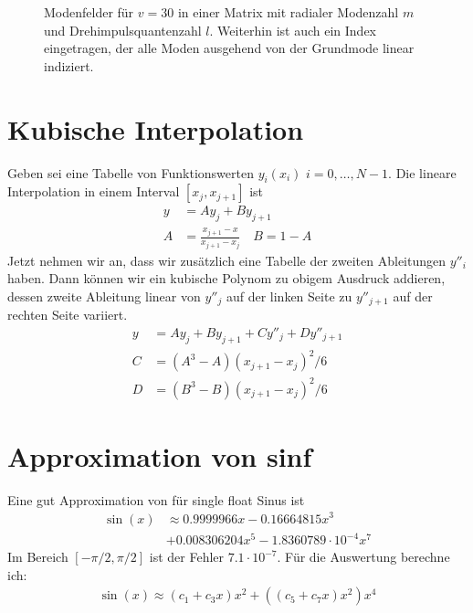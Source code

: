 \documentclass[DIV19,twocolumn]{scrartcl}
\def\svgending{\ifx\pdfoutput\undefined%
  .eps_tex%
  \else%
  .pdf_tex%
  \fi}
\newcommand{\svginput}[2]{{\def\svgscale{#1}}}
\begin{document}
\begin{figure}[hbtp]
  \centering
  \svginput{1}{modes}
  \caption{Modenfelder f\"ur $v=30$ in einer Matrix mit radialer
    Modenzahl $m$ und Drehimpulsquantenzahl $l$. Weiterhin ist auch
    ein Index eingetragen, der alle Moden ausgehend von der Grundmode
    linear indiziert.}
  \label{fig:fields}
\end{figure}
\section{Kubische Interpolation}
Geben sei eine Tabelle von Funktionswerten $y_i(x_i)$
$i=0,\ldots,N-1$. Die lineare Interpolation in einem Interval
$[x_j,x_{j+1}]$ ist
\begin{align}
  y &= Ay_j + By_{j+1} \\
  A &= \frac{x_{j+1}-x}{x_{j+1}-x_j}\quad B=1-A
\end{align}
Jetzt nehmen wir an, dass wir zus\"atzlich eine Tabelle der zweiten
Ableitungen $y''_i$ haben. Dann k\"onnen wir ein kubische Polynom zu
obigem Ausdruck addieren, dessen zweite Ableitung linear von $y''_j$
auf der linken Seite zu $y''_{j+1}$ auf der rechten Seite variiert.
\begin{align}
  y &= Ay_j + By_{j+1} + Cy''_j + Dy''_{j+1} \\
  C &= (A^3-A)(x_{j+1}-x_j)^2/6 \\
  D &= (B^3-B)(x_{j+1}-x_j)^2/6 
\end{align}
\section{Approximation von sinf}
Eine gut Approximation von f\"ur single float Sinus ist
\begin{align}
  \sin(x)&\approx 0.9999966 x -0.16664815 x^3 \nonumber\\
  &+0.008306204 x^5 -1.8360789\cdot 10^{-4} x^7 
\end{align}
Im Bereich $[-\pi/2,\pi/2]$ ist der Fehler $7.1\cdot 10^{-7}$.
F\"ur die Auswertung berechne ich:
\begin{align}
  \sin(x) \approx (c_1 + c_3 x) x^2 + ( (c_5 +c_7 x)x^2) x^4
\end{align}


\end{document}
